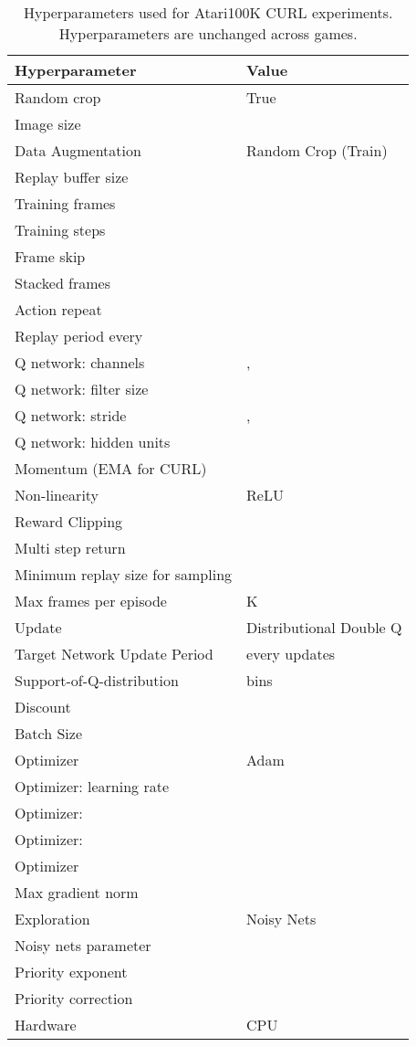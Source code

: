 \documentclass{article}
\begin{document}
\begin{table}[h]
\caption{Hyperparameters used for Atari100K CURL experiments. Hyperparameters are unchanged across games.}

\label{table:hyperparametersatari}
\vskip 0.15in
\begin{center}
\begin{small}
\begin{tabular}{ll}
\toprule
\textbf{Hyperparameter} & \textbf{Value}  \\
\midrule
Random crop    & True  \\ 
Image size    &   \\ 
Data Augmentation & Random Crop (Train) \\
Replay buffer size    &  \\ 
Training frames &  \\ 
Training steps &  \\
Frame skip &  \\
Stacked frames    &   \\ 
Action repeat    &  \\
Replay period every &  \\
Q network: channels & ,  \\
Q network: filter size &  \\
Q network: stride & ,  \\
Q network: hidden units &  \\
Momentum (EMA for CURL)  &   \\
Non-linearity & ReLU \\
Reward Clipping   &   \\ 
Multi step return &  \\
Minimum replay size for sampling &  \\ 
Max frames per episode & K \\
Update & Distributional Double Q \\
Target Network Update Period & every  updates \\
Support-of-Q-distribution &  bins \\ 
Discount  &  \\
Batch Size &   \\
Optimizer    & Adam  \\ 
Optimizer: learning rate &  \\
Optimizer:  &  \\
Optimizer:  &  \\ 
Optimizer  &  \\
Max gradient norm &  \\ 
Exploration & Noisy Nets   \\
Noisy nets parameter &  \\
Priority exponent &  \\
Priority correction &  \\
Hardware & CPU \\
\bottomrule
\end{tabular}
\end{small}
\end{center}
\vskip -0.1in
\end{table}
\end{document}
